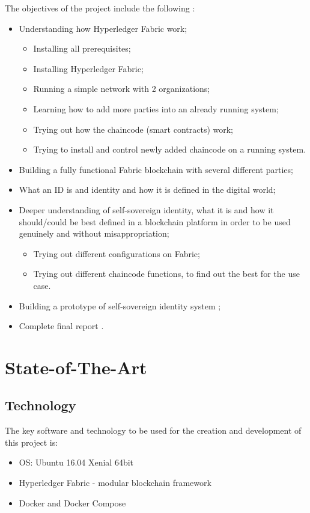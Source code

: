 \documentclass[a4paper,11pt]{report}
\begin{document}
The objectives of the project include the following :  
\begin{itemize}
\item Understanding how Hyperledger Fabric work;
	\begin{itemize}
	\item Installing all prerequisites;
	\item Installing Hyperledger Fabric; 
	\item Running a simple network with 2 organizations; 
	\item Learning how to add more parties into an already running system;
	\item Trying out how the chaincode (smart contracts) work;
	\item Trying to install and control newly added chaincode on a running system.
	\end{itemize}
\item Building a fully functional Fabric blockchain with several different parties;
\item What an ID is  and identity and how it is defined in the digital world;
\item Deeper understanding of self-sovereign identity, what it is and how it should/could be best defined in a blockchain platform in order to be used genuinely and without misappropriation;
	\begin{itemize}
	\item Trying out different configurations on Fabric;
	\item Trying out different chaincode functions, to find out the best for the use case.
	\end{itemize}
\item Building a prototype of self-sovereign identity system ;
\item Complete final report .

\end{itemize}



\chapter{State-of-The-Art}

\label{state}

\section{Technology}
\label{technology}
The key software and technology to be used for the creation and development of this project is:
\begin{itemize}
\item OS: Ubuntu 16.04 Xenial 64bit
\item Hyperledger Fabric -  modular blockchain framework
\item Docker and Docker Compose 
\end{itemize}
\end{document}
